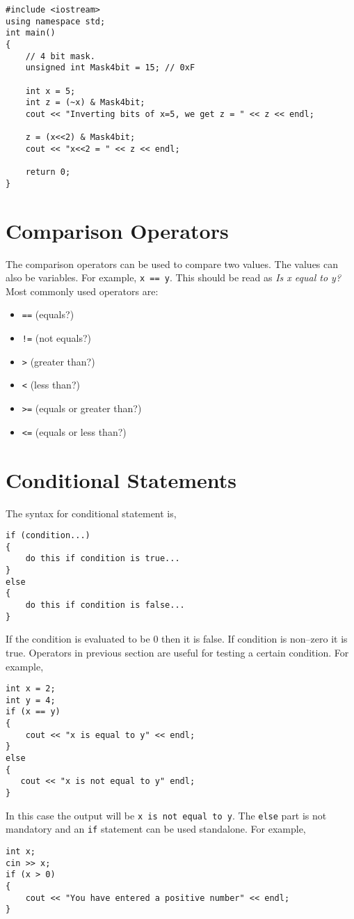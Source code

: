 \documentclass[12pt,a4paper]{article}
\begin{document}
\begin{lstlisting}[caption={Example: Masking 4 bits}]
#include <iostream> 
using namespace std; 
int main()
{
	// 4 bit mask.
	unsigned int Mask4bit = 15; // 0xF
	
	int x = 5;
	int z = (~x) & Mask4bit;
	cout << "Inverting bits of x=5, we get z = " << z << endl;
	
	z = (x<<2) & Mask4bit;
	cout << "x<<2 = " << z << endl;
	
	return 0;
}
\end{lstlisting}
\section{Comparison Operators}
The comparison operators can be used to compare two values. The values can also be variables.  For example, \verb|x == y|. This should be read as \textit{Is x equal to y?} Most commonly used operators are:
\begin{itemize}
\item \verb|==| (equals?)
\item \verb|!=| (not equals?)
\item \verb|>| (greater than?)
\item \verb|<| (less than?)
\item \verb|>=| (equals or greater than?)
\item \verb|<=| (equals or less than?)
\end{itemize}
\section{Conditional Statements}
The syntax for conditional statement is,
\begin{lstlisting}
if (condition...)
{
    do this if condition is true...
}
else
{
    do this if condition is false...
}
\end{lstlisting}
If the condition is evaluated to be 0 then it is false. If condition is non--zero it is true.
Operators in previous section are useful for testing a certain condition. For example,
\begin{lstlisting}
int x = 2;
int y = 4;
if (x == y)
{
    cout << "x is equal to y" << endl;
}
else
{
   cout << "x is not equal to y" endl;
}
\end{lstlisting}
In this case the output will be \verb|x is not equal to y|. The \verb|else| part is not mandatory and an \verb|if| statement can be used standalone. For example,
\begin{lstlisting}
int x;
cin >> x;
if (x > 0)
{
    cout << "You have entered a positive number" << endl;
}
\end{lstlisting}
\end{document}
